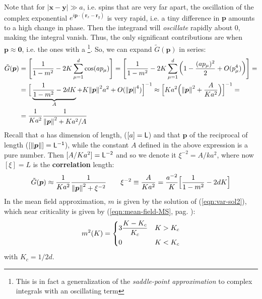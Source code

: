 \documentclass[../../main.tex]{subfiles}
\begin{document}
\medskip

Note that for $|\bm{x}-\bm{y}| \gg a$, i.e. spins that are very far apart, the oscillation of the complex exponential $e^{i \bm{p} \cdot (\bm{r}_x - \bm{r}_y)}$ is very rapid, i.e. a tiny difference in $\bm{p}$ amounts to a high change in phase. Then the integrand will \textit{oscillate} rapidly about $0$, making the integral vanish. Thus, the only significant contributions are when $\bm{p} \approx \bm{0}$, i.e. the ones with a \footnote{This is in fact a generalization of the \textit{saddle-point approximation} to complex integrals with an oscillating term}. So, we can expand $\tilde{G}(\bm{p})$ in series:
\begin{align} \label{eqn:eigenvalue-expansion}
    \tilde{G}(\bm{p}) &= \left[\frac{1}{1-m^2} - 2K \sum_{\mu=1}^d \cos(a p_\mu)\right] = \left[\frac{1}{1-m^2} - 2K \sum_{\mu=1}^d \left(1 - \frac{(a p_\mu)^2}{2} + O(p_\mu^4) \right) \right] =\\ \nonumber
    &= \Big[\underbrace{\frac{1}{1-m^2} - 2 dK}_{A} + K \norm{\bm{p}}^2 a^2 + O(\norm{\bm{p}}^4) \Big]^{-1} \approx \Big[Ka^2\Big(\norm{\bm{p}}^2 + \frac{A}{Ka^2} \Big) \Big]^{-1} =\\ \nonumber
    &= \frac{1}{Ka^2} \frac{1}{\norm{\bm{p}}^2 + Ka^2/A}   
\end{align}
Recall that $a$ has dimension of length, ($[a] = \sf{L}$) and that $\bm{p}$ of the reciprocal of length ($[\norm{\bm{p}}] = \sf{L}^{-1}$), while the constant $A$ defined in the above expression is a pure number. Then $[A/Ka^2] = \sf{L}^{-2}$ and so we denote it $\xi^{-2} = A/ka^2$, where now $[\xi] = \si{L}$ is the \textbf{correlation} length:
\begin{align}\label{eqn:G-corr}
    \tilde{G}(\bm{p}) \approx \frac{1}{Ka^2} \frac{1}{\norm{\bm{p}}^2 + \xi^{-2}} \qquad \xi^{-2} \equiv \frac{A}{Ka^2} = \frac{a^{-2}}{K} \Big[\frac{1}{1-m^2} - 2dK \Big]    
\end{align}
In the mean field approximation, $m$ is given by the solution of (\ref{eqn:var-sol2}), which near criticality is given by (\ref{eqn:mean-field-MS}, pag. \pageref{eqn:mean-field-MS}):
\begin{align*}
    m^2(K) = \begin{dcases}
        3 \frac{K-K_c}{K_c} & K > K_c\\
        0 & K < K_c 
    \end{dcases}
\end{align*}
with $K_c = 1/2d$. 
\end{document}

